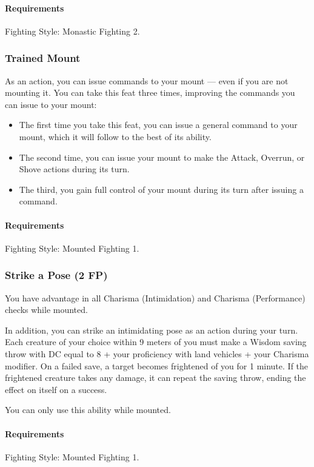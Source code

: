     \paragraph{Requirements} Fighting Style: Monastic Fighting 2.
\subsubsection{Trained Mount} \label{feat::trainedmount}
    As an action, you can issue commands to your mount --- even if you are not mounting it.
    You can take this feat three times, improving the commands you can issue to your mount:
    \begin{itemize}
        \item The first time you take this feat, you can issue a general command to your mount, which it will follow to the best of its ability.
        \item The second time, you can issue your mount to make the Attack, Overrun, or Shove actions during its turn.
        \item The third, you gain full control of your mount during its turn after issuing a command.
    \end{itemize}
    \paragraph{Requirements} Fighting Style: Mounted Fighting 1.
\subsubsection{Strike a Pose (2 FP)} \label{feat::strikeapose}
    You have advantage in all Charisma (Intimidation) and Charisma (Performance) checks while mounted.

    In addition, you can strike an intimidating pose as an action during your turn.
    Each creature of your choice within 9 meters of you must make a Wisdom saving throw with DC equal to 8 + your proficiency with land vehicles + your Charisma modifier.
    On a failed save, a target becomes frightened of you for 1 minute.
    If the frightened creature takes any damage, it can repeat the saving throw, ending the effect on itself on a success.

    You can only use this ability while mounted.
    \paragraph{Requirements} Fighting Style: Mounted Fighting 1.
